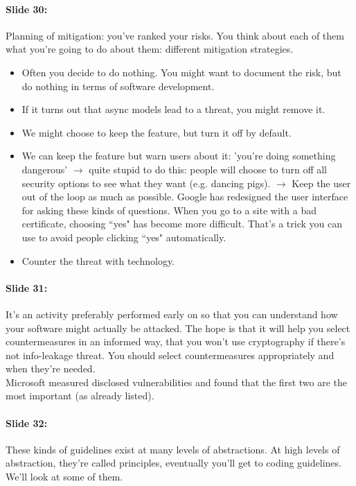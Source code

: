 \documentclass[10pt,a4paper]{report}
\begin{document}
\paragraph{Slide 30:} Planning of mitigation: you've ranked your risks. You think about each of them what you're going to do about them: different mitigation strategies. 
\begin{itemize}
\item Often you decide to do nothing. You might want to document the risk, but do nothing in terms of software development. 
\item If it turns out that async models lead to a threat, you might remove it. 
\item We might choose to keep the feature, but turn it off by default. 
\item We can keep the feature but warn users about it: 'you're doing something dangerous' $\rightarrow$ quite stupid to do this: people will choose to turn off all security options to see what they want (e.g. dancing pigs). $\rightarrow$ Keep the user out of the loop as much as possible. Google has redesigned the user interface for asking these kinds of questions. When you go to a site with a bad certificate, choosing ``yes" has become more difficult. That's a trick you can use to avoid people clicking ``yes" automatically.
\item Counter the threat with technology.
\end{itemize}

\paragraph{Slide 31:} It's an activity preferably performed early on so that you can understand how your software might actually be attacked. The hope is that it will help you select countermeasures in an informed way, that you won't use cryptography if there's not info-leakage threat. You should select countermeasures appropriately and when they're needed.\\
Microsoft measured disclosed vulnerabilities and found that the first two are the most important (as already listed). 

\paragraph{Slide 32:} These kinds of guidelines exist at many levels of abstractions. At high levels of abstraction, they're called principles, eventually you'll get to coding guidelines. We'll look at some of them.
\end{document}
